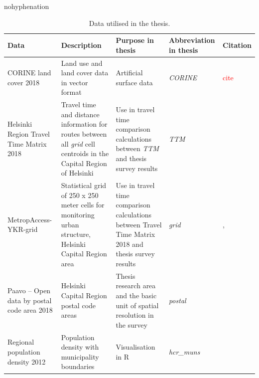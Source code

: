 \begin{hyphenrules}{nohyphenation}
    \begin{table}[H]
        \centering
        \caption[Thesis data]{Data utilised in the thesis.} 
        \label{tab:used_data}
        \scalebox{0.8}
        {\def\arraystretch{1.5} 
        \setlength\tabcolsep{1.2ex}
        \begin{tabular}{ @{} >{\raggedright\arraybackslash}p{4cm} >{\raggedright\arraybackslash}p{4cm} >{\raggedright\arraybackslash}p{4.5cm} >{\raggedright\arraybackslash}p{3.5cm} >{\raggedleft\arraybackslash}p{3.5cm} @{} }
            \toprule
            Data & Description & Purpose in thesis & Abbreviation in thesis & Citation \\
            \midrule
            CORINE land cover 2018 & Land use and land cover data in vector format & Artificial surface data & \textit{CORINE} & \textcolor{red}{cite} \\
            Helsinki Region Travel Time Matrix 2018 & Travel time and distance information for routes between all \textit{grid} cell centroids in the Capital Region of Helsinki & Use in travel time comparison calculations between \textit{TTM} and thesis survey results & \textit{TTM} & \cite{Tenkanen2018} \\
            MetropAccess-YKR-grid & Statistical grid of 250 x 250 meter cells for monitoring urban structure, Helsinki Capital Region area & Use in travel time comparison calculations between Travel Time Matrix 2018 and thesis survey results & \textit{grid} & \cite{Toivonen2014a}, \cite{StatisticsFinland2020} \\
            Paavo -- Open data by postal code area 2018 & Helsinki Capital Region postal code areas & Thesis research area and the basic unit of spatial resolution in the survey & \textit{postal} & \cite{StatisticsFinland2019a} \\
            Regional population density 2012 & Population density with municipality boundaries & Visualisation in R & \textit{hcr\_muns} & \cite{StatisticsFinland2012} \\

\end{tabular}}
\end{table}
\end{hyphenrules}
